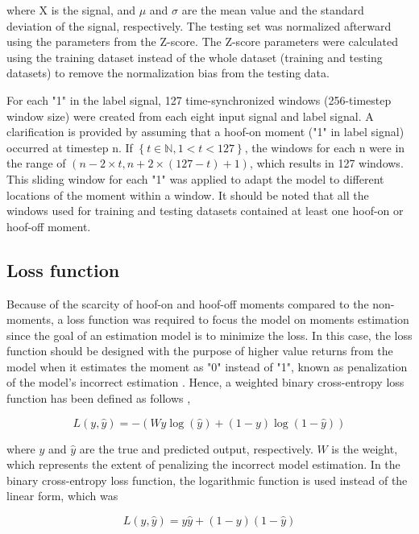 where X is the signal, and $\mu$ and $\sigma$ are the mean value and the standard deviation of the signal, respectively. The testing set was normalized afterward using the parameters from the Z-score. The Z-score parameters were calculated using the training dataset instead of the whole dataset (training and testing datasets) to remove the normalization bias from the testing data.

For each "1" in the label signal, 127 time-synchronized windows (256-timestep window size) were created from each eight input signal and label signal. A clarification is provided by assuming that a hoof-on moment ("1" in label signal) occurred at timestep n. If $\left\{t\in\mathbb{N},1<t<127\right\}$, the windows for each n were in the range of $(n-2\times t,n+2\times (127-t)+1)$, which results in 127 windows. This sliding window for each "1" was applied to adapt the model to different locations of the moment within a window. It should be noted that all the windows used for training and testing datasets contained at least one hoof-on or hoof-off moment.

\subsection{Loss function}

Because of the scarcity of hoof-on and hoof-off moments compared to the non-moments, a loss function was required to focus the model on moments estimation since the goal of an estimation model is to minimize the loss. In this case, the loss function should be designed with the purpose of higher value returns from the model when it estimates the moment as "0" instead of "1", known as penalization of the model's incorrect estimation \cite{aurelio_2019_learning}. Hence, a weighted binary cross-entropy loss function has been defined as follows \cite{ho_2020_the},

\begin{equation}
L(y,\hat{y})=-(Wy\log(\hat{y})+(1-y)\log(1-\hat{y}))
\end{equation}

\noindent where $y$ and $\hat{y}$ are the true and predicted output, respectively. $W$ is the weight, which represents the extent of penalizing the incorrect model estimation. In the binary cross-entropy loss function, the logarithmic function is used instead of the linear form, which was 

\begin{equation}
L(y,\hat{y})=y\hat{y}+(1-y)(1-\hat{y})
\end{equation}

